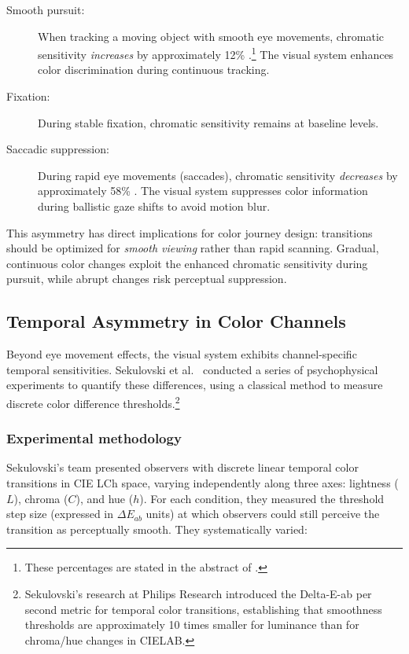 \begin{description}
    \item[Smooth pursuit:] When tracking a moving object with smooth eye movements, chromatic sensitivity \emph{increases} by approximately 12\% \citep{braun2017}.\footnote{These percentages are stated in the abstract of \citet{braun2017}.} The visual system enhances color discrimination during continuous tracking.
    
    \item[Fixation:] During stable fixation, chromatic sensitivity remains at baseline levels.
    
    \item[Saccadic suppression:] During rapid eye movements (saccades), chromatic sensitivity \emph{decreases} by approximately 58\% \citep{braun2017}. The visual system suppresses color information during ballistic gaze shifts to avoid motion blur.
\end{description}

This asymmetry has direct implications for color journey design: transitions should be optimized for \emph{smooth viewing} rather than rapid scanning. Gradual, continuous color changes exploit the enhanced chromatic sensitivity during pursuit, while abrupt changes risk perceptual suppression.

\subsection{Temporal Asymmetry in Color Channels}

Beyond eye movement effects, the visual system exhibits channel-specific temporal sensitivities. Sekulovski et al.\ \citeyearpar{sekulovski2007} conducted a series of psychophysical experiments to quantify these differences, using a classical method to measure discrete color difference thresholds.\footnote{Sekulovski's research at Philips Research introduced the Delta-E-ab per second metric for temporal color transitions, establishing that smoothness thresholds are approximately 10 times smaller for luminance than for chroma/hue changes in CIELAB.}

\subsubsection*{Experimental methodology}

Sekulovski's team presented observers with discrete linear temporal color transitions in CIE LCh space, varying independently along three axes: lightness ($L$), chroma ($C$), and hue ($h$). For each condition, they measured the threshold step size (expressed in $\Delta E_{ab}$ units) at which observers could still perceive the transition as perceptually smooth. They systematically varied:

